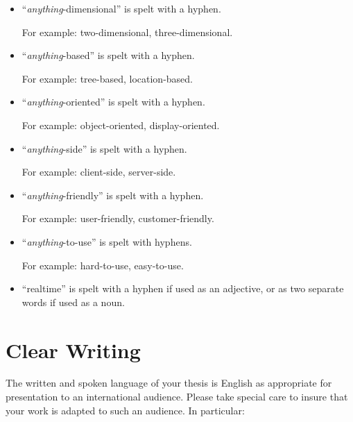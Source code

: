 \begin{itemize}
\item \enquote{\emph{anything}-dimensional} is spelt with a hyphen.

For example: two-dimensional, three-dimensional.



\item \enquote{\emph{anything}-based} is spelt with a hyphen.

For example: tree-based, location-based.



\item \enquote{\emph{anything}-oriented} is spelt with a hyphen.

For example: object-oriented, display-oriented.


\item \enquote{\emph{anything}-side} is spelt with a hyphen.

For example: client-side, server-side.


\item \enquote{\emph{anything}-friendly} is spelt with a hyphen.

For example: user-friendly, customer-friendly.


\item \enquote{\emph{anything}-to-use} is spelt with hyphens.

For example: hard-to-use, easy-to-use.



\item \enquote{realtime} is spelt with a hyphen if used as
  an adjective, or as two separate words if used as a noun.



\end{itemize}












\section{Clear Writing}
\label{sec:Clear}

The written and spoken language of your thesis is English as
appropriate for presentation to an international audience. Please take
special care to insure that your work is adapted to such an audience.
In particular:

